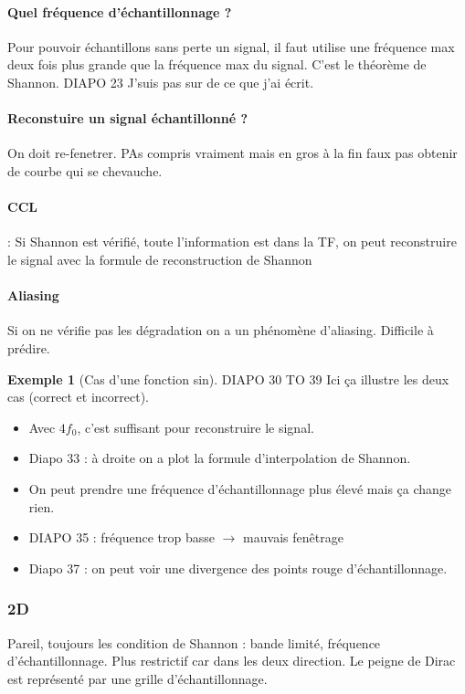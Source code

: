 \documentclass{article}
\theoremstyle{plain}%
\theoremstyle{definition}
\newtheorem{exmp}{Exemple}[section]
\theoremstyle{remark}
\begin{document}
\paragraph*{Quel fréquence d'échantillonnage ?} Pour pouvoir échantillons sans perte un signal, il faut utilise une fréquence max deux fois plus grande que la fréquence max du signal. C'est le théorème de Shannon. DIAPO 23 J'suis pas sur de ce que j'ai écrit. 

\paragraph*{Reconstuire un signal échantillonné ?} On doit re-fenetrer. PAs compris vraiment mais en gros à la fin faux pas obtenir de courbe qui se chevauche. 

\paragraph*{CCL} : Si Shannon est vérifié, toute l'information est dans la TF, on peut reconstruire le signal avec la formule de reconstruction de Shannon

\paragraph*{Aliasing} Si on ne vérifie pas les dégradation on a un phénomène d'aliasing. Difficile à prédire. 
\begin{exmp}[Cas d'une fonction sin]
    DIAPO 30 TO 39
    Ici ça illustre les deux cas (correct et incorrect).\begin{itemize}
        \item Avec $ 4f_0 $, c'est suffisant pour reconstruire le signal.
        \item Diapo 33 : à droite on a plot la formule d'interpolation de Shannon. 
        \item On peut prendre une fréquence d'échantillonnage plus élevé mais ça change rien.
        \item DIAPO 35 : fréquence trop basse $\rightarrow$ mauvais fenêtrage 
        \item Diapo 37 : on peut voir une divergence des points rouge d'échantillonnage. 
    \end{itemize}
\end{exmp}

\subsubsection{2D}
Pareil, toujours les condition de Shannon : bande limité, fréquence d'échantillonnage. Plus restrictif car dans les deux direction. Le peigne de Dirac est représenté par une grille d'échantillonnage.
\end{document}
